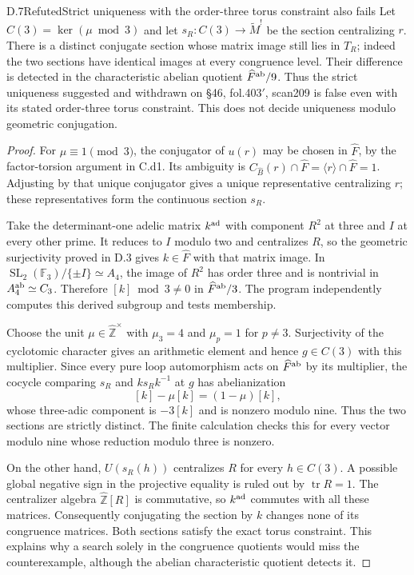 \begin{claim}{D.7}{Refuted}{Strict uniqueness with the order-three torus constraint also fails}
Let $C(3)=\ker(\mu\bmod3)$ and let $s_R:C(3)\to\widetilde M^!$ be the section centralizing $r$. There is a distinct conjugate section whose matrix image still lies in $T_R$; indeed the two sections have identical images at every congruence level. Their difference is detected in the characteristic abelian quotient $\widehat F^{\rm ab}/9$. Thus the strict uniqueness suggested and withdrawn on \S46, fol.403$'$, scan209 is false even with its stated order-three torus constraint. This does not decide uniqueness modulo geometric conjugation.
\end{claim}
\begin{proof}
For $\mu\equiv1\pmod3$, the conjugator of $u(r)$ may be chosen in $\widehat F$, by the factor-torsion argument in C.d1. Its ambiguity is $C_{\widehat B}(r)\cap\widehat F=\langle r\rangle\cap\widehat F=1$. Adjusting by that unique conjugator gives a unique representative centralizing $r$; these representatives form the continuous section $s_R$.

Take the determinant-one adelic matrix $k^{\rm ad}$ with component $R^2$ at three and $I$ at every other prime. It reduces to $I$ modulo two and centralizes $R$, so the geometric surjectivity proved in D.3 gives $k\in\widehat F$ with that matrix image. In $\operatorname{SL}_2(\mathbb F_3)/\{\pm I\}\simeq A_4$, the image of $R^2$ has order three and is nontrivial in $A_4^{\rm ab}\simeq C_3$. Therefore $[k]\bmod3\ne0$ in $\widehat F^{\rm ab}/3$. The program independently computes this derived subgroup and tests membership.

Choose the unit $\mu\in\widehat{\mathbb Z}^{\times}$ with $\mu_3=4$ and $\mu_p=1$ for $p\ne3$. Surjectivity of the cyclotomic character gives an arithmetic element and hence $g\in C(3)$ with this multiplier. Since every pure loop automorphism acts on $\widehat F^{\rm ab}$ by its multiplier, the cocycle comparing $s_R$ and $k s_R k^{-1}$ at $g$ has abelianization
\[
 [k]-\mu[k]=(1-\mu)[k],
\]
whose three-adic component is $-3[k]$ and is nonzero modulo nine. Thus the two sections are strictly distinct. The finite calculation checks this for every vector modulo nine whose reduction modulo three is nonzero.

On the other hand, $U(s_R(h))$ centralizes $R$ for every $h\in C(3)$. A possible global negative sign in the projective equality is ruled out by $\operatorname{tr}R=1$. The centralizer algebra $\widehat{\mathbb Z}[R]$ is commutative, so $k^{\rm ad}$ commutes with all these matrices. Consequently conjugating the section by $k$ changes none of its congruence matrices. Both sections satisfy the exact torus constraint. This explains why a search solely in the congruence quotients would miss the counterexample, although the abelian characteristic quotient detects it.
\end{proof}

